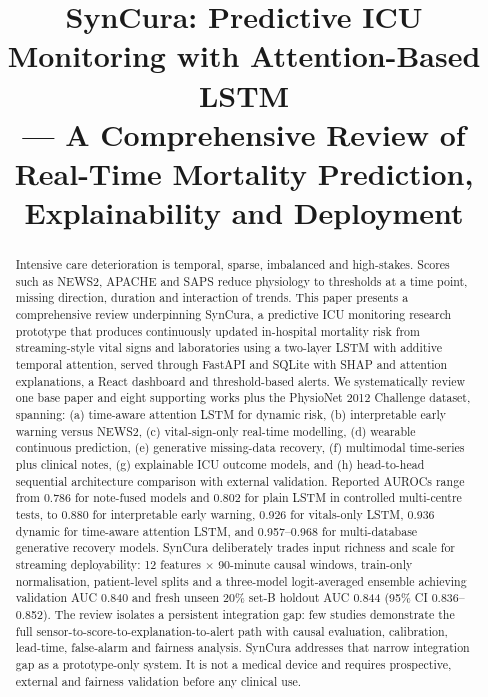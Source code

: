 \documentclass[a4paper,conference]{IEEEtran}
\begin{document}
\title{SynCura: Predictive ICU Monitoring with Attention-Based LSTM\\--- A Comprehensive Review of Real-Time Mortality Prediction, Explainability and Deployment}

\author{
}

\maketitle

\begin{abstract}
Intensive care deterioration is temporal, sparse, imbalanced and high-stakes. Scores such as NEWS2, APACHE and SAPS reduce physiology to thresholds at a time point, missing direction, duration and interaction of trends. This paper presents a comprehensive review underpinning SynCura, a predictive ICU monitoring research prototype that produces continuously updated in-hospital mortality risk from streaming-style vital signs and laboratories using a two-layer LSTM with additive temporal attention, served through FastAPI and SQLite with SHAP and attention explanations, a React dashboard and threshold-based alerts. We systematically review one base paper and eight supporting works plus the PhysioNet 2012 Challenge dataset, spanning: (a) time-aware attention LSTM for dynamic risk, (b) interpretable early warning versus NEWS2, (c) vital-sign-only real-time modelling, (d) wearable continuous prediction, (e) generative missing-data recovery, (f) multimodal time-series plus clinical notes, (g) explainable ICU outcome models, and (h) head-to-head sequential architecture comparison with external validation. Reported AUROCs range from 0.786 for note-fused models and 0.802 for plain LSTM in controlled multi-centre tests, to 0.880 for interpretable early warning, 0.926 for vitals-only LSTM, 0.936 dynamic for time-aware attention LSTM, and 0.957--0.968 for multi-database generative recovery models. SynCura deliberately trades input richness and scale for streaming deployability: 12 features $\times$ 90-minute causal windows, train-only normalisation, patient-level splits and a three-model logit-averaged ensemble achieving validation AUC 0.840 and fresh unseen 20\% set-B holdout AUC 0.844 (95\% CI 0.836--0.852). The review isolates a persistent integration gap: few studies demonstrate the full sensor-to-score-to-explanation-to-alert path with causal evaluation, calibration, lead-time, false-alarm and fairness analysis. SynCura addresses that narrow integration gap as a prototype-only system. It is not a medical device and requires prospective, external and fairness validation before any clinical use.
\end{abstract}
\end{document}
